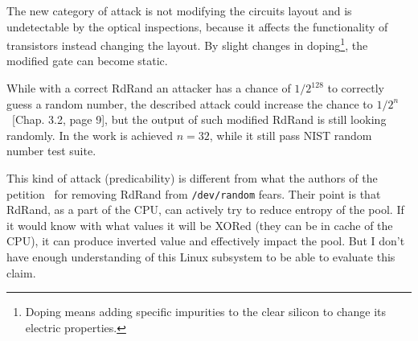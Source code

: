 \par{
The new category of attack is not modifying the circuits layout 
and is undetectable by the optical inspections, because it affects the functionality
 of transistors instead changing the layout. By slight changes 
 in doping\footnote{Doping means adding specific impurities to the clear silicon 
 to change its electric properties.}, the modified gate can become static.
}

\par{
While with a correct RdRand an attacker has a chance of $ 1/2^{128}$ to correctly guess 
a random number, the described attack could increase the chance to 
$ 1/2^n$~\cite{DopantAttack}[Chap. 3.2, page 9], but the output of such
 modified RdRand is still looking randomly. In the work is achieved  
 $n = 32$, while it still pass NIST random number test suite.
}

\par{
This kind of attack (predicability) is different from what the authors of the petition~\cite{PetitionRdRand} for removing RdRand from {\tt /dev/random} fears. Their point is that RdRand, as a part of the CPU, can actively try to reduce entropy of the pool. If it would know with what values it will be XORed (they can be in cache of the CPU), it can produce inverted value and effectively impact the pool. But I don't have enough understanding of this Linux subsystem to be able to evaluate this claim.
}
